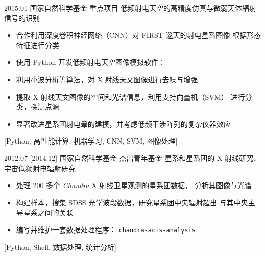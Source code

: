 \documentclass[zh]{resume}
\begin{document}
\begin{projects}
  \project
    {2015.01}%
    {国家自然科学基金}%
    {重点项目}%
    {低频射电天空的高精度仿真与微弱天体辐射信号的识别}%
    {\begin{itemize}
      \item 合作利用深度卷积神经网络（CNN）对 FIRST 巡天的射电星系图像
            根据形态特征进行分类
      \item 使用 Python 开发低频射电天空图像模拟软件：
      \item 利用小波分析等算法，对 X 射线天文图像进行去噪与增强
      \item 提取 X 射线天文图像的空间和光谱信息，利用支持向量机（SVM）
            进行分类，探测点源
      \item 显著改进星系团射电晕的建模，并考虑低频干涉阵列的复杂仪器效应
    \end{itemize}}%
    [Python, 高性能计算, 机器学习, CNN, SVM, 图像处理]

  \separator{0.7em}
  \project
    {2012.07}%
    [2014.12]%
    {国家自然科学基金}%
    {杰出青年基金}%
    {星系和星系团的 X 射线研究、宇宙低频射电辐射研究}%
    {\begin{itemize}
      \item 处理 200 多个 \textit{Chandra} X 射线卫星观测的星系团数据，
            分析其图像与光谱
      \item 构建样本，搜集 SDSS 光学波段数据，研究星系团中央辐射超出
            与其中央主导星系之间的关联
      \item 编写并维护一套数据处理程序：
              {\texttt{chandra-acis-analysis}}
    \end{itemize}}%
    [Python, Shell, 数据处理, 统计分析]
\end{projects}
\end{document}
